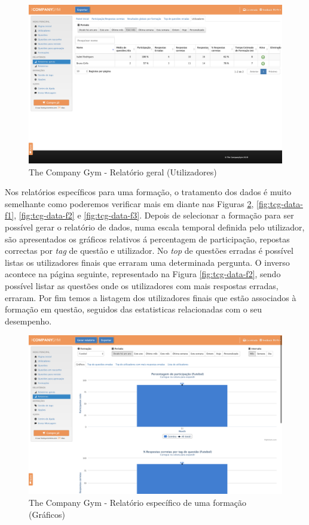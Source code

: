 \begin{figure}[ht!]
	\begin{center}
		\includegraphics[width=1\textwidth]{img/tcg/tcg-data4.png}
		\caption{The Company Gym - Relatório geral (Utilizadores)}
		\label{fig:tcg-data4}
	\end{center}
\end{figure}

Nos relatórios específicos para uma formação, o tratamento dos dados é muito semelhante como poderemos verificar mais em diante nas Figuras \ref{fig:tcg-data-f},  \ref{fig:tcg-data-f1}, \ref{fig:tcg-data-f2} e \ref{fig:tcg-data-f3}. Depois de selecionar a formação para ser possível gerar o relatório de dados, numa escala temporal definida pelo utilizador, são apresentados os gráficos relativos á percentagem de participação, repostas correctas por \textit{tag} de questão e utilizador. 
No \textit{top} de questões erradas é possível listas os utilizadores finais que erraram uma determinada pergunta. O inverso acontece na página seguinte, representado na Figura \ref{fig:tcg-data-f2}, sendo possível listar as questões onde os utilizadores com mais respostas erradas, erraram. 
Por fim temos a listagem dos utilizadores finais que estão associados à formação em questão, seguidos das estatisticas relacionadas com o seu desempenho.

\begin{figure}[ht!]
	\begin{center}
		\includegraphics[width=1\textwidth]{img/tcg/tcg-data-f.png}
		\caption{The Company Gym - Relatório específico de uma formação (Gráficos)}
		\label{fig:tcg-data-f}
	\end{center}
\end{figure}

